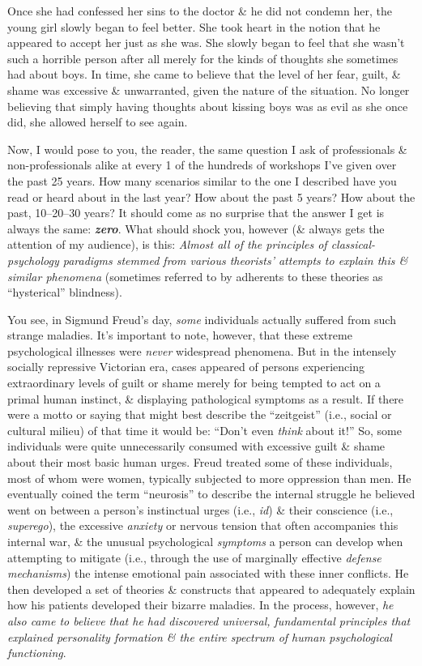 \documentclass{article}
\numberwithin{equation}{section}
\begin{document}
Once she had confessed her sins to the doctor \& he did not condemn her, the young girl slowly began to feel better. She took heart in the notion that he appeared to accept her just as she was. She slowly began to feel that she wasn't such a horrible person after all merely for the kinds of thoughts she sometimes had about boys. In time, she came to believe that the level of her fear, guilt, \& shame was excessive \& unwarranted, given the nature of the situation. No longer believing that simply having thoughts about kissing boys was as evil as she once did, she allowed herself to see again.

Now, I would pose to you, the reader, the same question I ask of professionals \& non-professionals alike at every 1 of the hundreds of workshops I've given over the past 25 years. How many scenarios similar to the one I described have you read or heard about in the last year? How about the past 5 years? How about the past, 10--20--30 years? It should come as no surprise that the answer I get is always the same: \textbf{\textit{zero}}. What should shock you, however (\& always gets the attention of my audience), is this: \textit{Almost all of the principles of classical-psychology paradigms stemmed from various theorists' attempts to explain this \& similar phenomena} (sometimes referred to by adherents to these theories as ``hysterical'' blindness).

You see, in Sigmund Freud's day, \textit{some} individuals actually suffered from such strange maladies. It's important to note, however, that these extreme psychological illnesses were \textit{never} widespread phenomena. But in the intensely socially repressive Victorian era, cases appeared of persons experiencing extraordinary levels of guilt or shame merely for being tempted to act on a primal human instinct, \& displaying pathological symptoms as a result. If there were a motto or saying that might best describe the ``zeitgeist'' (i.e., social or cultural milieu) of that time it would be: ``Don't even \textit{think} about it!'' So, some individuals were quite unnecessarily consumed with excessive guilt \& shame about their most basic human urges. Freud treated some of these individuals, most of whom were women, typically subjected to more oppression than men. He eventually coined the term ``neurosis'' to describe the internal struggle he believed went on between a person's instinctual urges (i.e., \textit{id}) \& their conscience (i.e., \textit{superego}), the excessive \textit{anxiety} or nervous tension that often accompanies this internal war, \& the unusual psychological \textit{symptoms} a person can develop when attempting to mitigate (i.e., through the use of marginally effective \textit{defense mechanisms}) the intense emotional pain associated with these inner conflicts. He then developed a set of theories \& constructs that appeared to adequately explain how his patients developed their bizarre maladies. In the process, however, \textit{he also came to believe that he had discovered universal, fundamental principles that explained personality formation \& the entire spectrum of human psychological functioning}.
\end{document}
